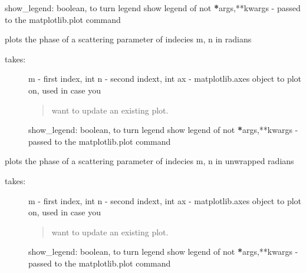 \documentclass[letterpaper,10pt,english]{sphinxmanual}
\begin{document}
\begin{fulllineitems}
\begin{fulllineitems}
\begin{description}
show\_legend: boolean, to turn legend show legend of not
{\color{red}\bfseries{}*}args,**kwargs - passed to the matplotlib.plot command

\end{description}

\end{fulllineitems}


\begin{fulllineitems}
\label{api/mwavepy:mwavepy.network.Network.plot_s_rad}
plots the phase of a scattering parameter of indecies m, n in
radians
\begin{description}
\item[{takes:}] \leavevmode
m - first index, int
n - second indext, int
ax - matplotlib.axes object to plot on, used in case you
\begin{quote}

want to update an existing plot.
\end{quote}

show\_legend: boolean, to turn legend show legend of not
{\color{red}\bfseries{}*}args,**kwargs - passed to the matplotlib.plot command

\end{description}

\end{fulllineitems}


\begin{fulllineitems}
\label{api/mwavepy:mwavepy.network.Network.plot_s_rad_unwrapped}
plots the phase of a scattering parameter of indecies m, n in
unwrapped radians
\begin{description}
\item[{takes:}] \leavevmode
m - first index, int
n - second indext, int
ax - matplotlib.axes object to plot on, used in case you
\begin{quote}

want to update an existing plot.
\end{quote}

show\_legend: boolean, to turn legend show legend of not
{\color{red}\bfseries{}*}args,**kwargs - passed to the matplotlib.plot command


\end{description}
\end{fulllineitems}
\end{fulllineitems}
\end{document}

